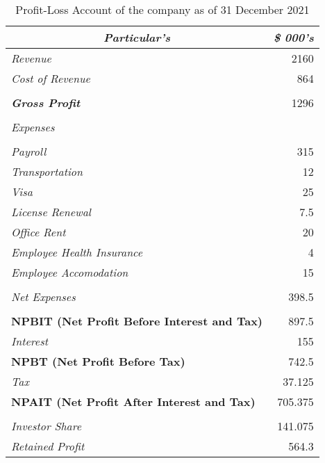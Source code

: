 \begin{table}[htbp]
  \centering
  \caption{Profit-Loss Account of the company as of 31 December 2021}
    \begin{tabular}{|l|r|}
    \hline
    \hline
    \toprule
    \multicolumn{1}{|c|}{\textit{\textbf{Particular's}}} & \multicolumn{1}{c|}{\textit{\textbf{\$ 000's}}} \\
    \hline
    \hline
    \midrule
    \textit{Revenue} & 2160 \\
    \midrule
    \textit{Cost of Revenue} & 864 \\
    \midrule
          &  \\
    \midrule
    \textit{\textbf{Gross Profit}} & 1296 \\
    \midrule
          &  \\
    \midrule
    \textit{Expenses} &  \\
    \midrule
          &  \\
    \midrule
    \textit{Payroll} & 315 \\
    \midrule
    \textit{Transportation} & 12 \\
    \midrule
    \textit{Visa} & 25 \\
    \midrule
    \textit{License Renewal} & 7.5 \\
    \midrule
    \textit{Office Rent} & 20 \\
    \midrule
    \textit{Employee Health Insurance} & 4 \\
    \midrule
    \textit{Employee Accomodation} & 15 \\
    \midrule
          &  \\
    \midrule
    \textit{Net Expenses} & 398.5 \\
    \midrule
          &  \\
    \midrule
    \textbf{NPBIT (Net Profit Before Interest and Tax)} & 897.5 \\
    \midrule
    \textit{Interest} & 155 \\
    \midrule
    \textbf{NPBT (Net Profit Before Tax)} & 742.5 \\
    \midrule
    \textit{Tax} & 37.125 \\
    \midrule
    \textbf{NPAIT (Net Profit After Interest and Tax)} & 705.375 \\
    \midrule
          &  \\
    \midrule
    \textit{Investor Share} & 141.075 \\
    \midrule
    \textit{Retained Profit} & 564.3 \\
    \hline
    \hline
    \bottomrule
    \end{tabular}%
  \label{tab:addlabel}%
\end{table}%

